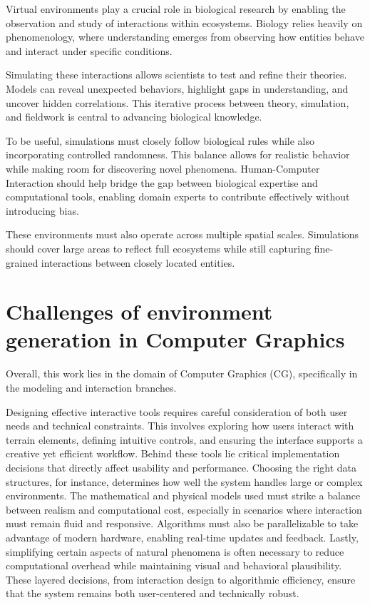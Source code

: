 Virtual environments play a crucial role in biological research by enabling the observation and study of interactions within ecosystems. Biology relies heavily on phenomenology, where understanding emerges from observing how entities behave and interact under specific conditions.

Simulating these interactions allows scientists to test and refine their theories. Models can reveal unexpected behaviors, highlight gaps in understanding, and uncover hidden correlations. This iterative process between theory, simulation, and fieldwork is central to advancing biological knowledge.

To be useful, simulations must closely follow biological rules while also incorporating controlled randomness. This balance allows for realistic behavior while making room for discovering novel phenomena. Human-Computer Interaction should help bridge the gap between biological expertise and computational tools, enabling domain experts to contribute effectively without introducing bias.

These environments must also operate across multiple spatial scales. Simulations should cover large areas to reflect full ecosystems while still capturing fine-grained interactions between closely located entities.


\section{Challenges of environment generation in Computer Graphics}

Overall, this work lies in the domain of Computer Graphics (CG), specifically in the modeling and interaction branches. 

Designing effective interactive tools requires careful consideration of both user needs and technical constraints. This involves exploring how users interact with terrain elements, defining intuitive controls, and ensuring the interface supports a creative yet efficient workflow. Behind these tools lie critical implementation decisions that directly affect usability and performance. Choosing the right data structures, for instance, determines how well the system handles large or complex environments. The mathematical and physical models used must strike a balance between realism and computational cost, especially in scenarios where interaction must remain fluid and responsive. Algorithms must also be parallelizable to take advantage of modern hardware, enabling real-time updates and feedback. Lastly, simplifying certain aspects of natural phenomena is often necessary to reduce computational overhead while maintaining visual and behavioral plausibility. These layered decisions, from interaction design to algorithmic efficiency, ensure that the system remains both user-centered and technically robust.




